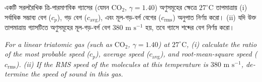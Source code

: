 \documentclass[12pt, a4paper]{article}
\begin{document}
\begin{tcolorbox}[questionbox={প্রশ্ন (Question) 4}]
\noindent
একটি সরলরৈখিক ত্রি-পারমাণবিক গ্যাসের (যেমন $\text{CO}_2$, $\gamma = 1.40$) অণুসমূহের ক্ষেত্রে $27^\circ\text{C}$ তাপমাত্রায় (i) সর্বাধিক সম্ভাব্য বেগ ($c_p$), গড় বেগ ($c_{\text{avg}}$), এবং মূল-গড়-বর্গ বেগের ($c_{\text{rms}}$) অনুপাত নির্ণয় করো। (ii) যদি উক্ত তাপমাত্রায় গ্যাসটিতে অণুসমূহের মূল-গড়-বর্গ বেগ $380\text{ m s}^{-1}$ হয়, তবে গ্যাসে শব্দের বেগ নির্ণয় করো।

\vspace{0.8em}
\begin{english}
\noindent\textit{\color{darkgray}
For a linear triatomic gas (such as $\text{CO}_2$, $\gamma = 1.40$) at $27^\circ\text{C}$, (i) calculate the ratio of the most probable speed ($c_p$), average speed ($c_{\text{avg}}$), and root-mean-square speed ($c_{\text{rms}}$). (ii) If the RMS speed of the molecules at this temperature is $380\text{ m s}^{-1}$, determine the speed of sound in this gas.
}
\end{english}
\end{tcolorbox}

\vspace{1em}
\end{document}
